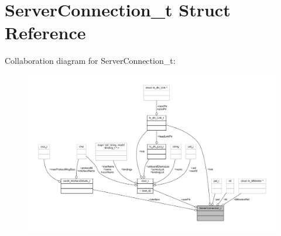 \hypertarget{struct_server_connection__t}{}\section{Server\+Connection\+\_\+t Struct Reference}
\label{struct_server_connection__t}


Collaboration diagram for Server\+Connection\+\_\+t\+:
\nopagebreak
\begin{figure}[H]
\begin{center}
\leavevmode
\includegraphics[width=350pt]{struct_server_connection__t__coll__graph}
\end{center}
\end{figure}
